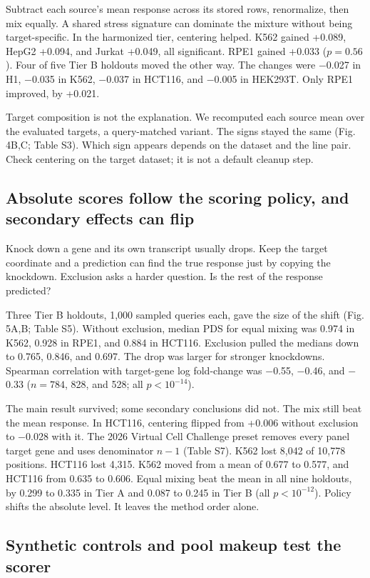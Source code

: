 \documentclass[12pt]{article}
\begin{document}
Subtract each source's mean response across its stored rows, renormalize, then mix equally. A shared stress signature can dominate the mixture without being target-specific. In the harmonized tier, centering helped. K562 gained +0.089, HepG2 +0.094, and Jurkat +0.049, all significant. RPE1 gained +0.033 ($p = 0.56$). Four of five Tier B holdouts moved the other way. The changes were $-$0.027 in H1, $-$0.035 in K562, $-$0.037 in HCT116, and $-$0.005 in HEK293T. Only RPE1 improved, by +0.021.

Target composition is not the explanation. We recomputed each source mean over the evaluated targets, a query-matched variant. The signs stayed the same (Fig. 4B,C; Table S3). Which sign appears depends on the dataset and the line pair. Check centering on the target dataset; it is not a default cleanup step.

\subsection{Absolute scores follow the scoring policy, and secondary effects can flip}

Knock down a gene and its own transcript usually drops. Keep the target coordinate and a prediction can find the true response just by copying the knockdown. Exclusion asks a harder question. Is the rest of the response predicted?

Three Tier B holdouts, 1,000 sampled queries each, gave the size of the shift (Fig. 5A,B; Table S5). Without exclusion, median PDS for equal mixing was 0.974 in K562, 0.928 in RPE1, and 0.884 in HCT116. Exclusion pulled the medians down to 0.765, 0.846, and 0.697. The drop was larger for stronger knockdowns. Spearman correlation with target-gene log fold-change was $-$0.55, $-$0.46, and $-$0.33 ($n = 784$, 828, and 528; all $p < 10^{-14}$).

The main result survived; some secondary conclusions did not. The mix still beat the mean response. In HCT116, centering flipped from +0.006 without exclusion to $-$0.028 with it. The 2026 Virtual Cell Challenge preset removes every panel target gene and uses denominator $n-1$ (Table S7). K562 lost 8,042 of 10,778 positions. HCT116 lost 4,315. K562 moved from a mean of 0.677 to 0.577, and HCT116 from 0.635 to 0.606. Equal mixing beat the mean in all nine holdouts, by 0.299 to 0.335 in Tier A and 0.087 to 0.245 in Tier B (all $p < 10^{-12}$). Policy shifts the absolute level. It leaves the method order alone.

\subsection{Synthetic controls and pool makeup test the scorer}
\end{document}
